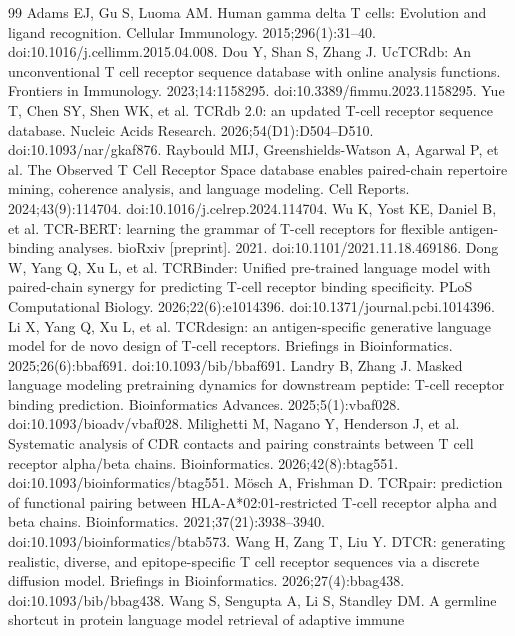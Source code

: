 \documentclass[a4paper,11pt]{article}
\begin{document}
\begin{thebibliography}{99}
 Adams EJ, Gu S, Luoma AM.
Human gamma delta T cells: Evolution and ligand recognition.
Cellular Immunology. 2015;296(1):31--40. doi:10.1016/j.cellimm.2015.04.008.
 Dou Y, Shan S, Zhang J.
UcTCRdb: An unconventional T cell receptor sequence database with online analysis
functions. Frontiers in Immunology. 2023;14:1158295.
doi:10.3389/fimmu.2023.1158295.
 Yue T, Chen SY, Shen WK, et al.
TCRdb 2.0: an updated T-cell receptor sequence database.
Nucleic Acids Research. 2026;54(D1):D504--D510.
doi:10.1093/nar/gkaf876.
 Raybould MIJ, Greenshields-Watson A, Agarwal P, et al.
The Observed T Cell Receptor Space database enables paired-chain repertoire
mining, coherence analysis, and language modeling.
Cell Reports. 2024;43(9):114704. doi:10.1016/j.celrep.2024.114704.
 Wu K, Yost KE, Daniel B, et al.
TCR-BERT: learning the grammar of T-cell receptors for flexible antigen-binding
analyses. bioRxiv [preprint]. 2021. doi:10.1101/2021.11.18.469186.
 Dong W, Yang Q, Xu L, et al.
TCRBinder: Unified pre-trained language model with paired-chain synergy for
predicting T-cell receptor binding specificity.
PLoS Computational Biology. 2026;22(6):e1014396. doi:10.1371/journal.pcbi.1014396.
 Li X, Yang Q, Xu L, et al.
TCRdesign: an antigen-specific generative language model for de novo design of
T-cell receptors. Briefings in Bioinformatics. 2025;26(6):bbaf691.
doi:10.1093/bib/bbaf691.
 Landry B, Zhang J.
Masked language modeling pretraining dynamics for downstream peptide:
T-cell receptor binding prediction. Bioinformatics Advances. 2025;5(1):vbaf028.
doi:10.1093/bioadv/vbaf028.
 Milighetti M, Nagano Y, Henderson J, et al.
Systematic analysis of CDR contacts and pairing constraints between T cell
receptor alpha/beta chains.
Bioinformatics. 2026;42(8):btag551. doi:10.1093/bioinformatics/btag551.
 M\"osch A, Frishman D.
TCRpair: prediction of functional pairing between HLA-A*02:01-restricted
T-cell receptor alpha and beta chains.
Bioinformatics. 2021;37(21):3938--3940. doi:10.1093/bioinformatics/btab573.
 Wang H, Zang T, Liu Y.
DTCR: generating realistic, diverse, and epitope-specific T cell receptor
sequences via a discrete diffusion model. Briefings in Bioinformatics.
2026;27(4):bbag438. doi:10.1093/bib/bbag438.
 Wang S, Sengupta A, Li S, Standley DM.
A germline shortcut in protein language model retrieval of adaptive immune

\end{thebibliography}
\end{document}

